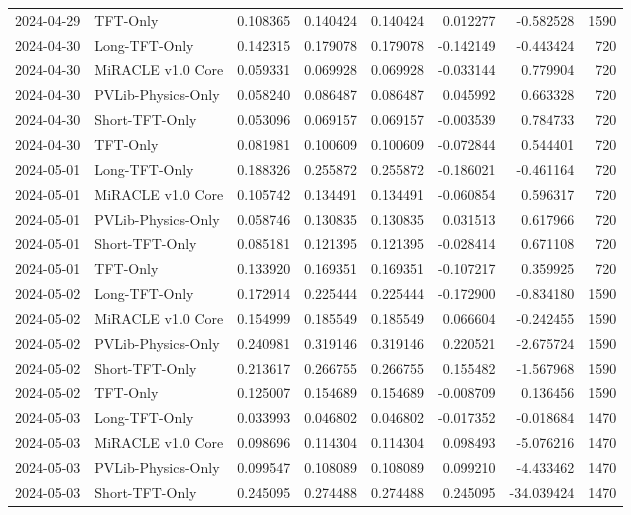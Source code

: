 \begin{tabular}{llrrrrrr}
2024-04-29 & TFT-Only & 0.108365 & 0.140424 & 0.140424 & 0.012277 & -0.582528 & 1590 \\
2024-04-30 & Long-TFT-Only & 0.142315 & 0.179078 & 0.179078 & -0.142149 & -0.443424 & 720 \\
2024-04-30 & MiRACLE v1.0 Core & 0.059331 & 0.069928 & 0.069928 & -0.033144 & 0.779904 & 720 \\
2024-04-30 & PVLib-Physics-Only & 0.058240 & 0.086487 & 0.086487 & 0.045992 & 0.663328 & 720 \\
2024-04-30 & Short-TFT-Only & 0.053096 & 0.069157 & 0.069157 & -0.003539 & 0.784733 & 720 \\
2024-04-30 & TFT-Only & 0.081981 & 0.100609 & 0.100609 & -0.072844 & 0.544401 & 720 \\
2024-05-01 & Long-TFT-Only & 0.188326 & 0.255872 & 0.255872 & -0.186021 & -0.461164 & 720 \\
2024-05-01 & MiRACLE v1.0 Core & 0.105742 & 0.134491 & 0.134491 & -0.060854 & 0.596317 & 720 \\
2024-05-01 & PVLib-Physics-Only & 0.058746 & 0.130835 & 0.130835 & 0.031513 & 0.617966 & 720 \\
2024-05-01 & Short-TFT-Only & 0.085181 & 0.121395 & 0.121395 & -0.028414 & 0.671108 & 720 \\
2024-05-01 & TFT-Only & 0.133920 & 0.169351 & 0.169351 & -0.107217 & 0.359925 & 720 \\
2024-05-02 & Long-TFT-Only & 0.172914 & 0.225444 & 0.225444 & -0.172900 & -0.834180 & 1590 \\
2024-05-02 & MiRACLE v1.0 Core & 0.154999 & 0.185549 & 0.185549 & 0.066604 & -0.242455 & 1590 \\
2024-05-02 & PVLib-Physics-Only & 0.240981 & 0.319146 & 0.319146 & 0.220521 & -2.675724 & 1590 \\
2024-05-02 & Short-TFT-Only & 0.213617 & 0.266755 & 0.266755 & 0.155482 & -1.567968 & 1590 \\
2024-05-02 & TFT-Only & 0.125007 & 0.154689 & 0.154689 & -0.008709 & 0.136456 & 1590 \\
2024-05-03 & Long-TFT-Only & 0.033993 & 0.046802 & 0.046802 & -0.017352 & -0.018684 & 1470 \\
2024-05-03 & MiRACLE v1.0 Core & 0.098696 & 0.114304 & 0.114304 & 0.098493 & -5.076216 & 1470 \\
2024-05-03 & PVLib-Physics-Only & 0.099547 & 0.108089 & 0.108089 & 0.099210 & -4.433462 & 1470 \\
2024-05-03 & Short-TFT-Only & 0.245095 & 0.274488 & 0.274488 & 0.245095 & -34.039424 & 1470 \\

\end{tabular}
